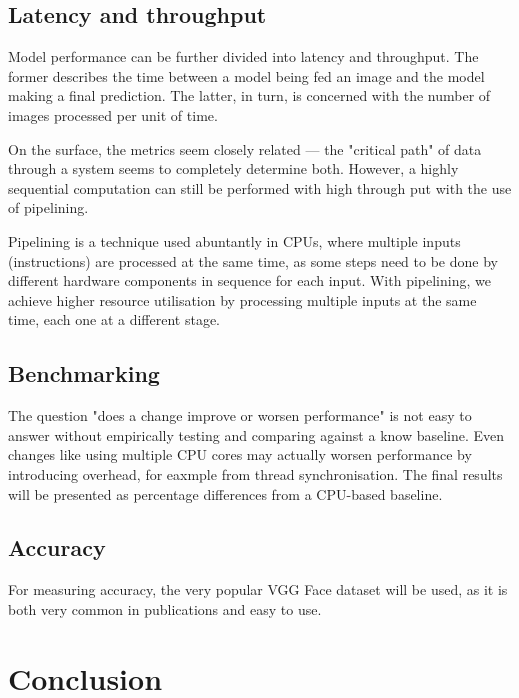 \documentclass[12pt]{article}
\begin{document}
\subsection{Latency and throughput}
Model performance can be further divided into latency and throughput. The former describes the time 
between a model being fed an image and the model making a final prediction. The latter, in turn, is concerned
with the number of images processed per unit of time.

On the surface, the metrics seem closely related --- the "critical path" of data through a 
system seems to completely determine both. However, a highly sequential computation can still be 
performed with high through put with the use of pipelining.

Pipelining is a technique used abuntantly in CPUs, where multiple inputs (instructions) are processed
at the same time, as some steps need to be done by different hardware components in sequence for each 
input. With pipelining, we achieve higher resource utilisation by processing multiple inputs
at the same time, each one at a different stage.

\subsection{Benchmarking}
The question "does a change improve or worsen performance" is not easy to answer without empirically
testing and comparing against a know baseline. Even changes like using multiple CPU cores may 
actually worsen performance by introducing overhead, for eaxmple from thread synchronisation.
The final results will be presented as percentage differences from a CPU-based baseline.

\subsection{Accuracy}
For measuring accuracy, the very popular VGG Face dataset will be used, as 
it is both very common in publications and easy to use.
\section{Conclusion}


\end{document}
